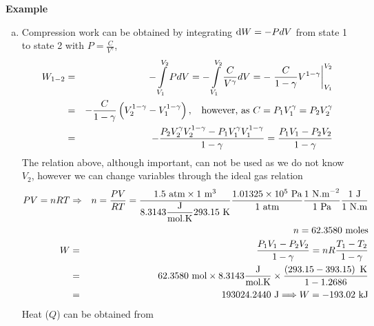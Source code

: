 \begin{MyExample}{\begin{center}{\bf Example}\end{center}}
\begin{enumerate}[(a)]
           \item Compression work can be obtained by integrating $\mathrm{d} W = -P dV$ from state 1 to state 2 with $P=\frac{C}{V^{\gamma}}$,
               \begin{eqnarray}
                 W_{1-2} &=& -\int\limits_{V_{1}}^{V_{2}} P dV = -\int\limits_{V_{1}}^{V_{2}}\displaystyle\frac{C}{V^{\gamma}} dV = -\left.\displaystyle\frac{C}{1-\gamma}V^{1-\gamma}\right|_{V_{1}}^{V_{2}} \nonumber \\
                         &=& -\displaystyle\frac{C}{1-\gamma}\left(V_{2}^{1-\gamma}-V_{1}^{1-\gamma}\right),\;\;\text{ however, as } C=P_{1}V_{1}^{\gamma}=P_{2}V_{2}^{\gamma} \nonumber \\
                         &=& -\displaystyle\frac{P_{2}V_{2}^{\gamma}V_{2}^{1-\gamma} - P_{1}V_{1}^{\gamma}V_{1}^{1-\gamma}}{1-\gamma} = \displaystyle\frac{P_{1}V_{1}-P_{2}V_{2}}{1-\gamma} \nonumber
               \end{eqnarray}
               The relation above, although important, can not be used as we do not know $V_{2}$, however we can change variables through the ideal gas relation
               \begin{eqnarray}
                 P V = n R T &\Rightarrow& n = \displaystyle\frac{P V}{R T } = \displaystyle\frac{1.5\text{ atm} \times 1\text{ m}^{3}}{ 8.3143 \displaystyle\frac{\text{J}}{\text{mol.K}} 293.15\text{ K}} \displaystyle\frac{1.01325\times 10^{5} \text{ Pa}}{1 \text{ atm}} \displaystyle\frac{ 1 \text{ N.m}^{-2}}{1\text{ Pa}}\displaystyle\frac{1 \text{ J}}{1\text{ N.m}} \nonumber \\
                 &&  n = 62.3580\text{ moles} \nonumber \\
                    W &=& \displaystyle\frac{P_{1}V_{1}-P_{2}V_{2}}{1-\gamma} = nR\displaystyle\frac{T_{1}- T_{2}}{1-\gamma} \nonumber \\
                      &=& 62.3580\text{ mol} \times 8.3143 \displaystyle\frac{\text{J}}{\text{mol.K}} \times \displaystyle\frac{\left(293.15-393.15\right)\text{ K}}{1-1.2686} \nonumber \\
                      &=& 193024.2440 \text{ J} \Longrightarrow W = -193.02 \text{ kJ} \nonumber
               \end{eqnarray}
              Heat ($Q$) can be obtained from
               \begin{eqnarray}

\end{eqnarray}
\end{enumerate}
\end{MyExample}
